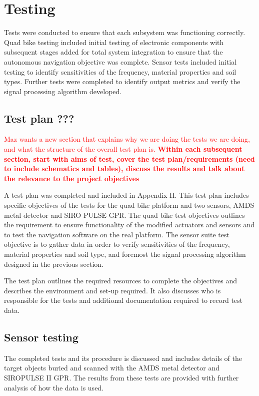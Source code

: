 \documentclass[main.tex]{subfiles}
\begin{document}
\chapter{Testing}
Tests were conducted to ensure that each subsystem was functioning correctly. Quad bike testing included initial testing of electronic components with subsequent stages added for total system integration to ensure that the autonomous navigation objective was complete. Sensor tests included initial testing to identify sensitivities of the frequency, material properties and soil types. Further tests were completed to identify output metrics and verify the signal processing algorithm developed. 

\section{Test plan ???}
\textcolor{red}{Maz wants a new section that explains why we are doing the tests we are doing, and what the structure of the overall test plan is. \textbf{Within each subsequent section, start with aims of test, cover the test plan/requirements (need to include schematics and tables), discuss the results and talk about the relevance to the project objectives}}


A test plan was completed and included in Appendix H. This test plan includes specific objectives of the tests for the quad bike platform and two sensors, AMDS metal detector and SIRO PULSE GPR. The quad bike test objectives outlines the requirement to ensure functionality of the modified actuators and sensors and to test the navigation software on the real platform. The sensor suite test objective is to gather data in order to verify sensitivities of the frequency, material properties and soil type, and foremost the signal processing algorithm designed in the previous section. 

The test plan outlines the required resources to complete the objectives and describes the environment and set-up required. It also discusses who is responsible for the tests and additional documentation required to record test data. 

\section{Sensor testing}
The completed tests and its procedure is discussed and includes details of the target objects buried and scanned with the AMDS metal detector and SIROPULSE II GPR. The results from these tests are provided with further analysis of how the data is used. 
\end{document}
